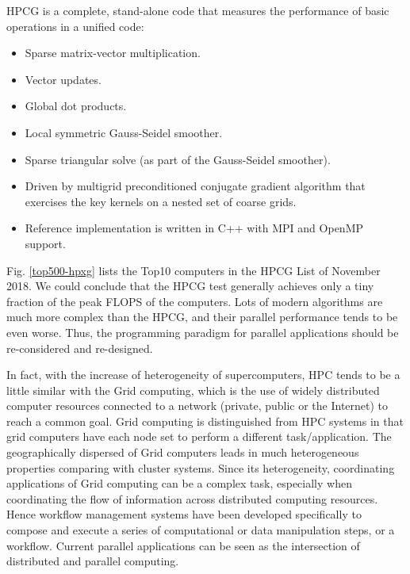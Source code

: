 HPCG is a complete, stand-alone code that measures the performance of basic operations in a unified code:

\begin{itemize}
	\item Sparse matrix-vector multiplication.
	\item Vector updates.
	\item Global dot products.
	\item Local symmetric Gauss-Seidel smoother.
	\item Sparse triangular solve (as part of the Gauss-Seidel smoother).
	\item Driven by multigrid preconditioned conjugate gradient algorithm that exercises the key kernels on a nested set of coarse grids.
	\item Reference implementation is written in C++ with MPI and OpenMP support.
\end{itemize}

Fig. \ref{top500-hpxg} lists the Top10 computers in the HPCG List of November 2018.  We could conclude that the HPCG test generally achieves only a tiny fraction of the peak FLOPS of the computers. Lots of modern algorithms are much more complex than the HPCG, and their parallel performance tends to be even worse. Thus,  the programming paradigm for parallel applications should be re-considered and re-designed.

In fact, with the increase of heterogeneity of supercomputers, HPC tends to be a little similar with the Grid computing, which is the use of widely distributed computer resources connected to a network (private, public or the Internet) to reach a common goal. Grid computing is distinguished from HPC systems in that grid computers have each node set to perform a different task/application. The geographically dispersed of Grid computers leads in much heterogeneous properties comparing with cluster systems. Since its heterogeneity, coordinating applications of Grid computing can be a complex task, especially when coordinating the flow of information across distributed computing resources. Hence workflow management systems have been developed specifically to compose and execute a series of computational or data manipulation steps, or a workflow. Current parallel applications can be seen as the intersection of distributed and parallel computing.

